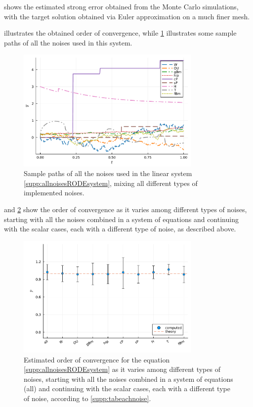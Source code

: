 \documentclass[reqno,12pt]{amsart}
\theoremstyle{plain} %
\theoremstyle{definition} %
\begin{document}
 shows the estimated strong error obtained from the Monte Carlo simulations, with the target solution obtained via Euler approximation on a much finer mesh. 

 illustrates the obtained order of convergence, while \cref{supp:figsamplepathsallnoises} illustrates some sample paths of all the noises used in this system.

\begin{figure}[htb]
    \centerline{\includegraphics[width=0.8\textwidth]{img/noisepath_allnoises.pdf}}
    \caption{Sample paths of all the noises used in the linear system \cref{supp:allnoisesRODEsystem}, mixing all different types of implemented noises.}
    \label{supp:figsamplepathsallnoises}
\end{figure}

 and \cref{supp:figordereachnoise} show the order of convergence as it varies among different types of noises, starting with all the noises combined in a system of equations and continuing with the scalar cases, each with a different type of noise, as described above.

\begin{figure}[htb]
    \centerline{\includegraphics[width=0.8\textwidth]{img/order_dep_on_noise_allnoises.pdf}}
    \caption{Estimated order of convergence for the equation \cref{supp:allnoisesRODEsystem} as it varies among different types of noises, starting with all the noises combined in a system of equations (all) and continuing with the scalar cases, each with a different type of noise, according to \cref{supp:tabeachnoise}.}
    \label{supp:figordereachnoise}
\end{figure}
\end{document}
